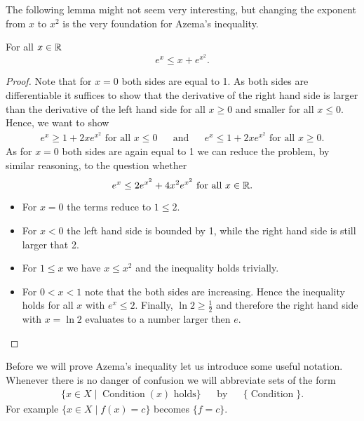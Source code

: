 
The following lemma might not seem very interesting, but changing the exponent from $x$ to $x^2$ is the very foundation for Azema's inequality.
\begin{lemma}\label{lem:exToex2} For all $x\in\mathbb{R}$
\[e^{x}\leq x+e^{x^2}.\]
\end{lemma} 
\begin{proof}
Note that for $x=0$ both sides are equal to 1. As both sides are differentiable it suffices to show that the derivative of the right hand side is larger than the derivative of the left hand side for all $x\geq0$ and smaller for all $x\leq0$. Hence, we want to show
\begin{align*}
e^x\geq 1+2xe^{x^2}\text{ for all $x\leq 0$} &&\text{and}&& e^x\leq 1+2xe^{x^2}\text{ for all $x\geq 0$}.
\end{align*}
As for $x=0$ both sides are again equal to 1 we can reduce the problem, by similar reasoning, to the question whether
\[e^x\leq 2e^{x^2}+4x^2e^{x^2}\text{ for all $x\in\mathbb{R}$}.\]

\begin{itemize}
\item For $x=0$ the terms reduce to $1\leq2$.
\item For $x<0$ the left hand side is bounded by 1, while the right hand side is still larger that 2.
\item For $1\leq x$ we have $x\leq x^2$ and the inequality holds trivially.
\item For $0< x< 1$ note that the both sides are increasing. Hence the inequality holds for all $x$ with $e^x\leq 2$. Finally, $\ln2\geq\frac{1}{2}$ and therefore the right hand side with $x=\ln2$ evaluates to a number larger then $e$.  
\end{itemize}
\end{proof}

Before we will prove Azema's inequality let us introduce some useful notation. Whenever there is no danger of confusion we will abbreviate sets of the form
\begin{align*}
\{x\in X\mid \operatorname{Condition}(x)\text{ holds}\}&&\text{by}&&\{\operatorname{Condition}\}.
\end{align*}
For example $\{x\in X\mid f(x)= c\}$ becomes $\{f= c\}$.

